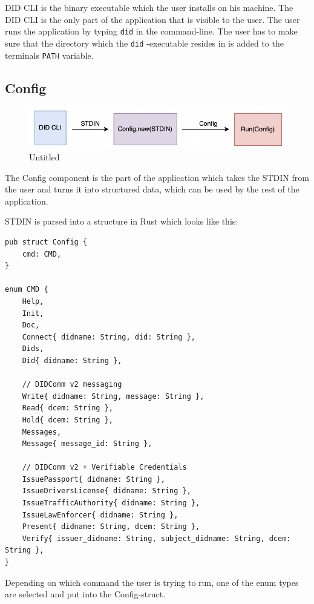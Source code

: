 DID CLI is the binary executable which the user installs on his machine.
The DID CLI is the only part of the application that is visible to the
user. The user runs the application by typing
\lstinline!did! in the command-line. The user has to make
sure that the directory which the \lstinline!did!
-executable resides in is added to the terminals
\lstinline!PATH! variable.

\hypertarget{config}{%
\subsection{Config}\label{config}}

\begin{figure}
\centering
\includegraphics{Architecture 1442df162dbe45f4a423ba37d3e12363/Untitled 2.png}
\caption{Untitled}
\end{figure}

The Config component is the part of the application which takes the
STDIN from the user and turns it into structured data, which can be used
by the rest of the application.

STDIN is parsed into a structure in Rust which looks like this:

\begin{lstlisting}
pub struct Config {
    cmd: CMD,
}

enum CMD {
    Help,
    Init,
    Doc,
    Connect{ didname: String, did: String },
    Dids,
    Did{ didname: String },

    // DIDComm v2 messaging
    Write{ didname: String, message: String },
    Read{ dcem: String },
    Hold{ dcem: String },
    Messages,
    Message{ message_id: String },

    // DIDComm v2 + Verifiable Credentials
    IssuePassport{ didname: String },
    IssueDriversLicense{ didname: String },
    IssueTrafficAuthority{ didname: String },
    IssueLawEnforcer{ didname: String },
    Present{ didname: String, dcem: String },
    Verify{ issuer_didname: String, subject_didname: String, dcem: String },
}
\end{lstlisting}

Depending on which command the user is trying to run, one of the enum
types are selected and put into the Config-struct.

